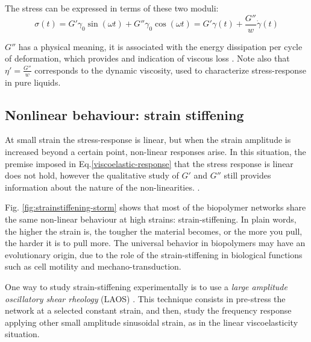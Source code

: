 The stress can be expressed in terms of these two moduli:
\begin{equation}\label{viscoelastic-stress-G}
\sigma(t) = G'\gamma_0 \sin(\omega t) + G''\gamma_0\cos(\omega t) = G'\gamma(t)
 + \frac{G''}{w}\dot{\gamma}(t)
\end{equation}

$G''$ has a physical meaning, it is associated with the energy dissipation
per cycle of deformation, which provides and indication of viscous
loss \citep{macosko_rheology:_1994}. Note also that $\eta'=\frac{G''}{w}$
corresponds to the dynamic viscosity, used to characterize stress-response in pure liquids.

\subsection{Nonlinear behaviour: strain stiffening}
\label{intro-strainstiffening}
At small strain the stress-response is linear, but when the strain amplitude is
increased beyond a certain point, non-linear responses arise. In this situation,
the premise imposed in Eq.\ref{viscoelastic-response} that the stress response is linear does not
hold, however the qualitative study of $G'$ and $G''$ still provides information
about the nature of the non-linearities.
\citep{storm_nonlinear_2005,mackintosh_elasticity_1995,yao_nonlinear_2011,sheinman_nonlinear_2012,carrillo_nonlinear_2013}.

Fig. \ref{fig:strainstiffening-storm} shows that most of the biopolymer networks
share the same non-linear behaviour at high strains: strain-stiffening. In plain
words, the higher the strain is, the tougher the material becomes, or the more you pull,
the harder it is to pull more. The universal behavior in
biopolymers may have an evolutionary origin, due to the role of the strain-stiffening in biological functions such as cell motility
and mechano-transduction.

One way to study strain-stiffening experimentally is to use a \emph{large
amplitude oscillatory shear rheology} (LAOS) \citep{hyun_review_2011}. This
technique consists in pre-stress the network at a selected constant strain, and
then, study the frequency response applying other small amplitude sinusoidal strain, as in the
linear viscoelasticity situation.


